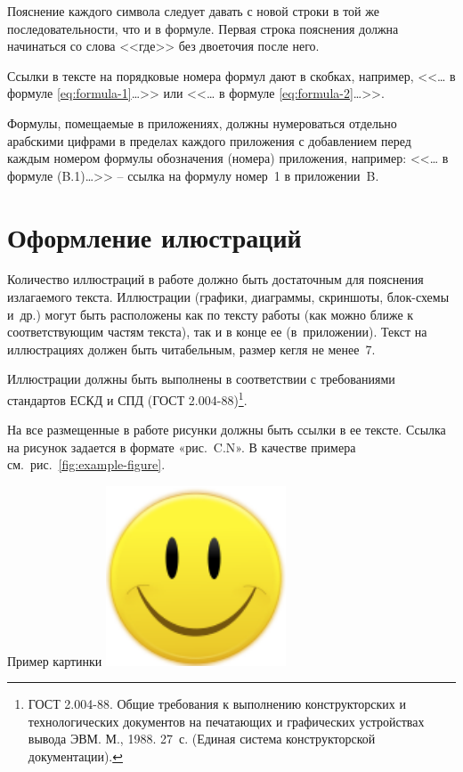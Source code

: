\documentclass[PI,VKR]{HSEUniversity}
\begin{document}
Пояснение каждого символа следует давать с новой строки в той же последовательности, что и в формуле. Первая строка пояснения должна начинаться со слова <<где>> без двоеточия после него.

Ссылки в тексте на порядковые номера формул дают в скобках, например, <<\dots{} в формуле \eqref{eq:formula-1}\dots>> или <<\dots{} в формуле \eqref{eq:formula-2}\dots>>.

Формулы, помещаемые в приложениях, должны нумероваться отдельно арабскими цифрами в пределах каждого приложения с добавлением перед каждым номером формулы обозначения (номера) приложения, например: <<\dots{} в формуле (B.1)\dots>> – ссылка на формулу номер 1 в приложении B.

\section{Оформление илюстраций}

Количество иллюстраций в работе должно быть достаточным для пояснения излагаемого текста. Иллюстрации (графики, диаграммы, скриншоты, блок-схемы и др.) могут быть расположены как по тексту работы (как можно ближе к соответствующим частям текста), так и в конце ее (в приложении). Текст на иллюстрациях должен быть читабельным, размер кегля не менее 7.

Иллюстрации должны быть выполнены в соответствии с требованиями стандартов ЕСКД и СПД (ГОСТ 2.004-88)\footnote{ГОСТ 2.004-88. Общие требования к выполнению конструкторских и технологических документов на печатающих и графических устройствах вывода ЭВМ. М., 1988. 27 с. (Единая система конструкторской документации).}.

На все размещенные в работе рисунки должны быть ссылки в ее тексте. Ссылка на рисунок задается в формате «рис. C.N». В качестве примера см.~рис.~\ref{fig:example-figure}.

\begin{FIGURE}[t]{Пример картинки\label{fig:example-figure}}
	\includegraphics[width=0.4\textwidth]{img/fig}
\end{FIGURE}
\end{document}
